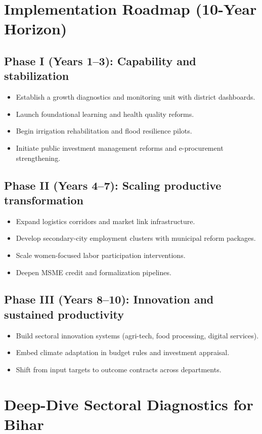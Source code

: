 \documentclass[preprint,12pt]{elsarticle}
\begin{document}
\section{Implementation Roadmap (10-Year Horizon)}
\subsection{Phase I (Years 1--3): Capability and stabilization}
\begin{itemize}
\item Establish a growth diagnostics and monitoring unit with district dashboards.
\item Launch foundational learning and health quality reforms.
\item Begin irrigation rehabilitation and flood resilience pilots.
\item Initiate public investment management reforms and e-procurement strengthening.
\end{itemize}

\subsection{Phase II (Years 4--7): Scaling productive transformation}
\begin{itemize}
\item Expand logistics corridors and market link infrastructure.
\item Develop secondary-city employment clusters with municipal reform packages.
\item Scale women-focused labor participation interventions.
\item Deepen MSME credit and formalization pipelines.
\end{itemize}

\subsection{Phase III (Years 8--10): Innovation and sustained productivity}
\begin{itemize}
\item Build sectoral innovation systems (agri-tech, food processing, digital services).
\item Embed climate adaptation in budget rules and investment appraisal.
\item Shift from input targets to outcome contracts across departments.
\end{itemize}


\section{Deep-Dive Sectoral Diagnostics for Bihar}
\end{document}
